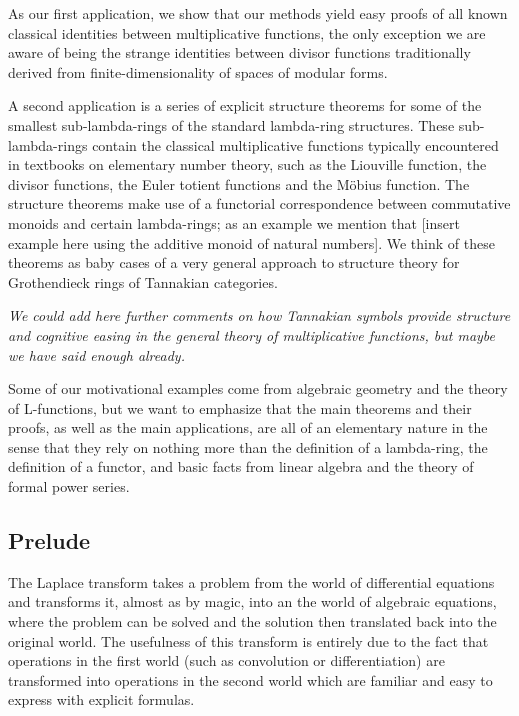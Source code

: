 \documentclass[a4paper]{article}
\theoremstyle{definition}
\theoremstyle{remark}
\begin{document}
As our first application, we show that our methods yield easy proofs of all known classical identities between multiplicative functions, the only exception we are aware of being the strange identities between divisor functions traditionally derived from finite-dimensionality of spaces of modular forms. %

A second application is a series of explicit structure theorems for some of the smallest sub-lambda-rings of the standard lambda-ring structures. These sub-lambda-rings contain the classical multiplicative functions typically encountered in textbooks on elementary number theory, such as the Liouville function, the divisor functions, the Euler totient functions and the M\"obius function. The structure theorems make use of a functorial correspondence between commutative monoids and certain lambda-rings; as an example we mention that [insert example here using the additive monoid of natural numbers]. We think of these theorems as baby cases of a very general approach to structure theory for Grothendieck rings of Tannakian categories.

\emph{We could add here further comments on how Tannakian symbols provide structure and cognitive easing in the general theory of multiplicative functions, but maybe we have said enough already.}

Some of our motivational examples come from algebraic geometry and the theory of L-functions, but we want to emphasize that the main theorems and their proofs, as well as the main applications, are all of an elementary nature in the sense that they rely on nothing more than the definition of a lambda-ring, the definition of a functor, and basic facts from linear algebra and the theory of formal power series.

\subsection{Prelude}

The Laplace transform takes a problem from the world of differential equations and transforms it, almost as by magic, into an the world of algebraic equations, where the problem can be solved and the solution then translated back into the original world. The usefulness of this transform is entirely due to the fact that operations in the first world (such as convolution or differentiation) are transformed into operations in the second world which are familiar and easy to express with explicit formulas.
\end{document}
